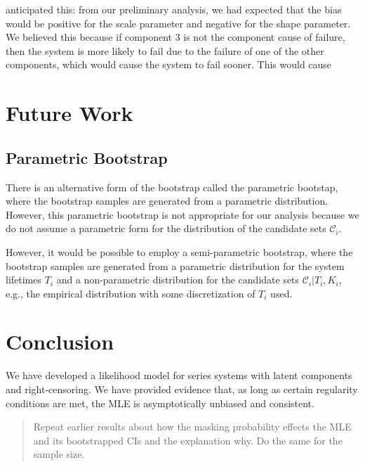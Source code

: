 \documentclass[
]{article}
\begin{document}
\begin{enumerate}
  anticipated this: from our preliminary analysis, we had expected that
  the bias would be positive for the scale parameter and negative for
  the shape parameter. We believed this because if component 3 is not
  the component cause of failure, then the system is more likely to fail
  due to the failure of one of the other components, which would cause
  the system to fail sooner. This would cause
\end{enumerate}

\hypertarget{future-work}{%
\section{Future Work}\label{future-work}}

\hypertarget{parametric-bootstrap}{%
\subsection{Parametric Bootstrap}\label{parametric-bootstrap}}

There is an alternative form of the bootstrap called the parametric
bootstap, where the bootstrap samples are generated from a parametric
distribution. However, this parametric bootstrap is not appropriate for
our analysis because we do not assume a parametric form for the
distribution of the candidate sets \(\mathcal{C}_i\).

However, it would be possible to employ a semi-parametric bootstrap,
where the bootstrap samples are generated from a parametric distribution
for the system lifetimes \(T_i\) and a non-parametric distribution for
the candidate sets \(\mathcal{C}_i | T_i, K_i\), e.g., the empirical
distribution with some discretization of \(T_i\) used.

\hypertarget{conclusion}{%
\section{Conclusion}\label{conclusion}}

We have developed a likelihood model for series systems with latent
components and right-censoring. We have provided evidence that, as long
as certain regularity conditions are met, the MLE is asymptotically
unbiased and consistent.

\begin{quote}
Repeat earlier results about how the masking probability effects the MLE
and its bootstrapped CIs and the explanation why. Do the same for the
sample size.
\end{quote}
\end{document}
